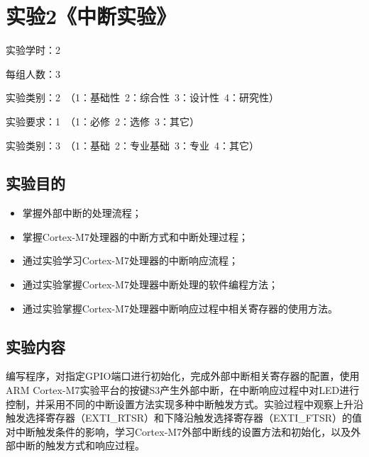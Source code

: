 ﻿\documentclass[UTF8,12pt]{article}
\begin{document}
\newpage


\section{实验2《中断实验》}

实验学时：2

每组人数：3

实验类别：2\ （1：基础性\ 2：综合性\ 3：设计性\ 4：研究性）

实验要求：1\ （1：必修\ 2：选修\ 3：其它）

实验类别：3\ （1：基础\ 2：专业基础\ 3：专业\ 4：其它）

\subsection{实验目的}
\begin{itemize}
  \item 掌握外部中断的处理流程；
  \item 掌握Cortex-M7处理器的中断方式和中断处理过程；
  \item 通过实验学习Cortex-M7处理器的中断响应流程；
  \item 通过实验掌握Cortex-M7处理器中断处理的软件编程方法；
  \item 通过实验掌握Cortex-M7处理器中断响应过程中相关寄存器的使用方法。
\end{itemize}

\subsection{实验内容}
编写程序，对指定GPIO端口进行初始化，完成外部中断相关寄存器的配置，使用ARM Cortex-M7实验平台的按键S3产生外部中断，在中断响应过程中对LED进行控制，并采用不同的中断设置方法实现多种中断触发方式。实验过程中观察上升沿触发选择寄存器（EXTI\_RTSR）和下降沿触发选择寄存器（EXTI\_FTSR）的值对中断触发条件的影响，学习Cortex-M7外部中断线的设置方法和初始化，以及外部中断的触发方式和响应过程。
\end{document}
